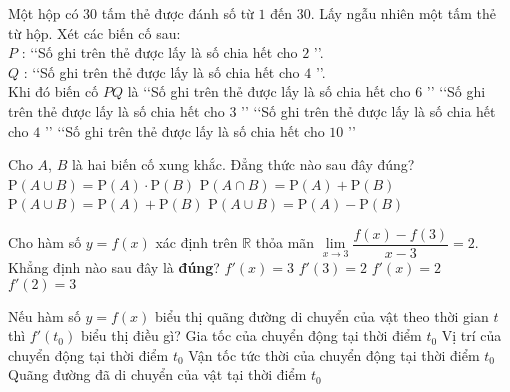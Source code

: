 \begin{ex}%
Một hộp có $30$ tấm thẻ được đánh số từ $1$ đến $30$. Lấy ngẫu nhiên một tấm thẻ từ hộp. Xét các biến cố sau:\\
$P$ : \lq\lq Số ghi trên thẻ được lấy là số chia hết cho $2$ \rq\rq.\\
$Q$ : \lq\lq Số ghi trên thẻ được lấy là số chia hết cho $4$ \rq\rq.\\
Khi đó biến cố $PQ$ là
\choice
{\lq\lq Số ghi trên thẻ được lấy là số chia hết cho $6$ \rq\rq}
{\lq\lq Số ghi trên thẻ được lấy là số chia hết cho $3$ \rq\rq}
{\True \lq\lq Số ghi trên thẻ được lấy là số chia hết cho $4$ \rq\rq}
{\lq\lq Số ghi trên thẻ được lấy là số chia hết cho $10$ \rq\rq}
\end{ex}

\begin{ex}%
Cho $A$, $B$ là hai biến cố xung khắc. Đẳng thức nào sau đây đúng?
\choice
{$\mathrm {P}(A \cup B)=\mathrm {P}(A)\cdot \mathrm {P}(B)$}
{$\mathrm {P}(A \cap B)=\mathrm {P}(A)+\mathrm {P}(B)$}
{\True $\mathrm {P}(A \cup B)=\mathrm {P}(A)+\mathrm {P}(B)$}
{$\mathrm {P}(A \cup B)=\mathrm {P}(A)-\mathrm {P}(B)$}
\end{ex}

\begin{ex}%
Cho hàm số $y=f(x)$ xác định trên $\mathbb{R}$ thỏa mãn $\lim\limits_{x \to 3} \dfrac{f(x)-f(3)}{x-3}=2$. Khẳng định nào sau đây là \textbf{đúng}?
\choice
{$f'(x)=3$}
{\True $f'(3)=2$}
{$f'(x)=2$}
{$f'(2)=3$}
\end{ex}

\begin{ex}%
	Nếu hàm số $y=f(x)$ biểu thị quãng đường di chuyển của vật theo thời gian $t$ thì $f'(t_0)$ biểu thị điều gì?
	\choice
	{Gia tốc của chuyển động tại thời điểm $t_0$}
	{Vị trí của chuyển động tại thời điểm $t_0$}
	{\True Vận tốc tức thời của chuyển động tại thời điểm $t_0$}
	{Quãng đường đã di chuyển của vật tại thời điểm $t_0$}
	\end{ex}

